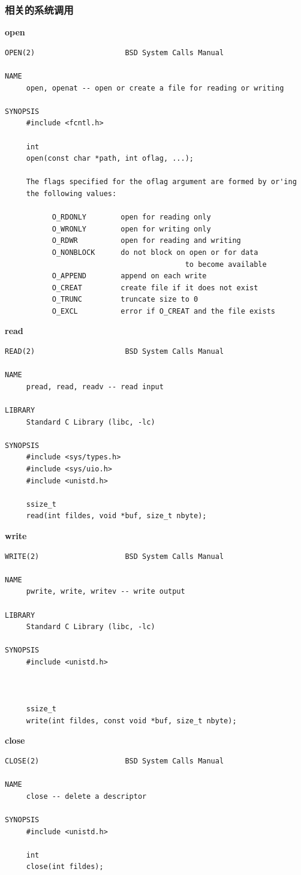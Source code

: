 \subsubsection{相关的系统调用}
\textbf{open}
\begin{lstlisting}
OPEN(2)                     BSD System Calls Manual 

NAME
     open, openat -- open or create a file for reading or writing

SYNOPSIS
     #include <fcntl.h>

     int
     open(const char *path, int oflag, ...);

     The flags specified for the oflag argument are formed by or'ing 
     the following values:

           O_RDONLY        open for reading only
           O_WRONLY        open for writing only
           O_RDWR          open for reading and writing
           O_NONBLOCK      do not block on open or for data 
                                          to become available
           O_APPEND        append on each write
           O_CREAT         create file if it does not exist
           O_TRUNC         truncate size to 0
           O_EXCL          error if O_CREAT and the file exists

\end{lstlisting}
\textbf{read}
\begin{lstlisting}
READ(2)                     BSD System Calls Manual 

NAME
     pread, read, readv -- read input

LIBRARY
     Standard C Library (libc, -lc)

SYNOPSIS
     #include <sys/types.h>
     #include <sys/uio.h>
     #include <unistd.h>

     ssize_t
     read(int fildes, void *buf, size_t nbyte);
\end{lstlisting}

\textbf{write}
\begin{lstlisting}
WRITE(2)                    BSD System Calls Manual

NAME
     pwrite, write, writev -- write output

LIBRARY
     Standard C Library (libc, -lc)

SYNOPSIS
     #include <unistd.h>



     ssize_t
     write(int fildes, const void *buf, size_t nbyte);

\end{lstlisting}
\textbf{close}
\begin{lstlisting}
CLOSE(2)                    BSD System Calls Manual 

NAME
     close -- delete a descriptor

SYNOPSIS
     #include <unistd.h>

     int
     close(int fildes);

\end{lstlisting}
